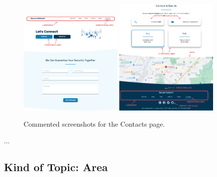 \documentclass[12pt]{report}
\begin{document}
\begin{figure}[H]
	\centering
	\includegraphics[width=0.45\textwidth]{high_fid_wireframes/contacts/1.png}
	\includegraphics[width=0.45\textwidth]{high_fid_wireframes/contacts/2.png}
	\caption{Commented screenshots for the Contacts page.}
\end{figure}
\color{white}...\color{black}

\subsection{Kind of Topic: Area}
\end{document}
